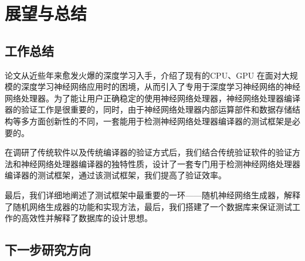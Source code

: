 ﻿\chapter{展望与总结}
\section{工作总结}
论文从近些年来愈发火爆的深度学习入手，介绍了现有的CPU、GPU 在面对大规模的深度学习神经网络应用时的困境，从而引入了专用于深度学习神经网络的神经网络处理器。为了能让用户正确稳定的使用神经网络处理器，神经网络处理器编译器的验证工作是很重要的，同时，由于神经网络处理器内部运算部件和数据存储结构等多方面创新性的不同，一套能用于检测神经网络处理器编译器的测试框架是必要的。

在调研了传统软件以及传统编译器的验证方式后，我们结合传统验证软件的验证方法和神经网络处理器编译器的独特性质，设计了一套专门用于检测神经网络处理器编译器的测试框架，通过该测试框架，我们提高了验证效率。

最后，我们详细地阐述了测试框架中最重要的一环——随机神经网络生成器，解释了随机网络生成器的功能和实现方法，最后，我们搭建了一个数据库来保证测试工作的高效性并解释了数据库的设计思想。

\section{下一步研究方向}

